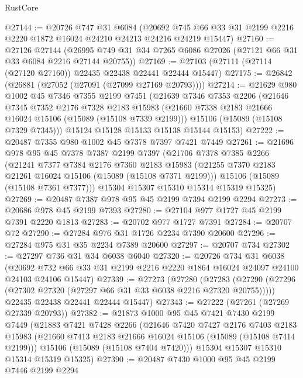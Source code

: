 \begin{lexlean}{RustCore}
\begin{coremodule}
@27144 := @20726
    @747
    @31
    @6084
    (@20692 @745 @66 @33 @31 @2199 @2216 @2220 @1872 @16024 @24210 @24213 @24216 @24219 @15447)
@27160 := @27126
    @27144
    (@26995 @749 @31 @34 @7265 @6086 @27026 (@27121 @66 @31 @33 @6084 @2216 @27144 @20755))
@27169 := @27103 (@27111 (@27114 (@27120 @27160)) @22435 @22438 @22441 @22444 @15447)
@27175 := @26842 (@26881 (@27052 (@27091 (@27099 @27169 @20793))))
@27214 := @21629
    @980
    @1002
    @45
    @7346
    @7355
    @2199
    @7451
    (@21639
      @7346
      @7353
      @2206
      (@21646
        @7345
        @7352
        @2176
        @7328
        @2183
        @15983
        (@21660 @7338 @2183 @21666 @16024 @15106 (@15089 (@15108 @7339 @2199)))
        @15106
        (@15089 (@15108 @7329 @7345)))
      @15124
      @15128
      @15133
      @15138
      @15144
      @15153)
@27222 := @20487 @7355 @980 @1002 @45 @7378 @7397 @7421 @7449
@27261 := @21696
    @978
    @95
    @45
    @7378
    @7387
    @2199
    @7397
    (@21706
      @7378
      @7385
      @2266
      (@21241
        @7377
        @7384
        @2176
        @7360
        @2183
        @15983
        (@21255 @7370 @2183 @21261 @16024 @15106 (@15089 (@15108 @7371 @2199)))
        @15106
        (@15089 (@15108 @7361 @7377)))
      @15304
      @15307
      @15310
      @15314
      @15319
      @15325)
@27269 := @20487 @7387 @978 @95 @45 @2199 @7394 @2199 @2294
@27273 := @20686 @978 @45 @2199 @7393
@27280 := @27104 @977 @1727 @45 @2199 @7391 @2220 @1813
@27283 := @20702 @977 @1727 @7391
@27284 := @20707 @72
@27290 := @27284 @976 @31 @1726 @2234 @7390 @20600
@27296 := @27284 @975 @31 @35 @2234 @7389 @20600
@27297 := @20707 @734
@27302 := @27297 @736 @31 @34 @6038 @6040
@27320 := @20726
    @734
    @31
    @6038
    (@20692 @732 @66 @33 @31 @2199 @2216 @2220 @1864 @16024 @24097 @24100 @24103 @24106 @15447)
@27339 := @27273
    (@27280
      (@27283 (@27290 (@27296 (@27302 @27320 (@27297 @66 @31 @33 @6038 @2216 @27320 @20755)))))
      @22435
      @22438
      @22441
      @22444
      @15447)
@27343 := @27222 (@27261 (@27269 @27339 @20793))
@27382 := @21873
    @1000
    @95
    @45
    @7421
    @7430
    @2199
    @7449
    (@21883
      @7421
      @7428
      @2266
      (@21646
        @7420
        @7427
        @2176
        @7403
        @2183
        @15983
        (@21660 @7413 @2183 @21666 @16024 @15106 (@15089 (@15108 @7414 @2199)))
        @15106
        (@15089 (@15108 @7404 @7420)))
      @15304
      @15307
      @15310
      @15314
      @15319
      @15325)
@27390 := @20487 @7430 @1000 @95 @45 @2199 @7446 @2199 @2294

\end{coremodule}
\end{lexlean}

